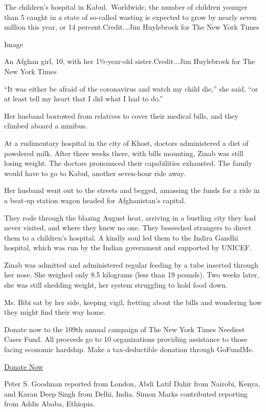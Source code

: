 The children's hospital in Kabul.~Worldwide, the number of children
younger than 5 caught in a state of so-called wasting is expected to
grow by nearly seven million this year, or 14 percent.Credit...Jim
Huylebroek for The New York Times

Image

An Afghan girl, 10, with her 1½-year-old sister.Credit...Jim Huylebroek
for The New York Times

``It was either be afraid of the coronavirus and watch my child die,''
she said, ``or at least tell my heart that I did what I had to do.''

Her husband borrowed from relatives to cover their medical bills, and
they climbed aboard a minibus.

At a rudimentary hospital in the city of Khost, doctors administered a
diet of powdered milk. After three weeks there, with bills mounting,
Zinab was still losing weight. The doctors pronounced their capabilities
exhausted. The family would have to go to Kabul, another seven-hour ride
away.

Her husband went out to the streets and begged, amassing the funds for a
ride in a beat-up station wagon headed for Afghanistan's capital.

They rode through the blazing August heat, arriving in a bustling city
they had never visited, and where they knew no one. They beseeched
strangers to direct them to a children's hospital. A kindly soul led
them to the Indira Gandhi hospital, which was run by the Indian
government and supported by UNICEF.

Zinab was admitted and administered regular feeding by a tube inserted
through her nose. She weighed only 8.5 kilograms (less than 19 pounds).
Two weeks later, she was still shedding weight, her system struggling to
hold food down.

Ms. Bibi sat by her side, keeping vigil, fretting about the bills and
wondering how they might find their way home.

Donate now to the 109th annual campaign of The New York Times Neediest
Cases Fund. All proceeds go to 10 organizations providing assistance to
those facing economic hardship. Make a tax-deductible donation through
GoFundMe.

\href{https://charity.gofundme.com/o/en/campaign/neediest-cases-fund-2020}{Donate
Now}

Peter S. Goodman reported from London, Abdi Latif Dahir from Nairobi,
Kenya, and Karan Deep Singh from Delhi, India. Simon Marks contributed
reporting from Addis Ababa, Ethiopia.

